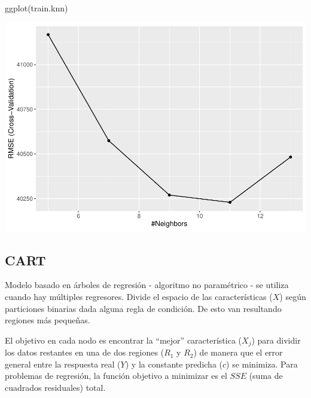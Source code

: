 \documentclass[
]{article}
\newenvironment{Shaded}{\begin{snugshade}}{\end{snugshade}}
\newcommand{\AttributeTok}[1]{\textcolor[rgb]{0.77,0.63,0.00}{#1}}
\newcommand{\FunctionTok}[1]{\textcolor[rgb]{0.00,0.00,0.00}{#1}}
\newcommand{\NormalTok}[1]{#1}
\newcommand{\OtherTok}[1]{\textcolor[rgb]{0.56,0.35,0.01}{#1}}
\newcommand{\SpecialCharTok}[1]{\textcolor[rgb]{0.00,0.00,0.00}{#1}}
\begin{document}
\begin{Shaded}
\begin{Highlighting}[]
\FunctionTok{ggplot}\NormalTok{(train.knn)}
\end{Highlighting}
\end{Shaded}

\includegraphics{LAB02_files/figure-latex/unnamed-chunk-5-1.pdf}

\begin{Shaded}
\end{Shaded}

\hypertarget{cart}{%
\subsection{CART}\label{cart}}

Modelo basado en árboles de regresión - algoritmo no paramétrico - se
utiliza cuando hay múltiples regresores. Divide el espacio de las
características (\(X\)) según particiones binarias dada alguna regla de
condición. De esto van resultando regiones más pequeñas.

El objetivo en cada nodo es encontrar la ``mejor'' característica
(\(X_j\)) para dividir los datos restantes en una de dos regiones
(\(R_1\) y \(R_2\)) de manera que el error general entre la respuesta
real (\(Y\)) y la constante predicha (\(c\)) se minimiza. Para problemas
de regresión, la función objetivo a minimizar es el \(SSE\) (suma de
cuadrados residuales) total.
\end{document}
